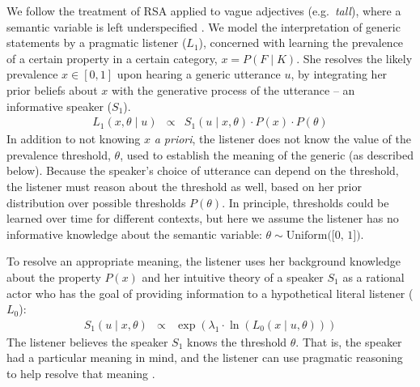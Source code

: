 \documentclass[12pt,letterpaper]{article}
\begin{document}
We follow the treatment of RSA applied to vague adjectives (e.g.~\emph{tall}), where a semantic variable is left underspecified \cite{Lassiter2013,Lassiter2015}.
We model the interpretation of generic statements by a pragmatic listener ($L_1$), concerned with learning the prevalence of a certain property in a certain category, $x=P(F \mid K)$.
She resolves the likely prevalence $x \in [0, 1]$ upon hearing a generic utterance $u$, by integrating her prior beliefs about $x$ with the generative process of the utterance -- an informative speaker ($S_1$).
%
\begin{eqnarray}
L_{1}(x , \theta \mid u) &\propto& S_{1}(u \mid x, \theta) \cdot P(x) \cdot P(\theta) \label{eq:L1}
\end{eqnarray}
%
In addition to not knowing $x$ \emph{a priori}, the listener does not know the value of the prevalence threshold, $\theta$, used to establish the meaning of the generic (as described below). Because the speaker's choice of utterance can depend on the threshold, the listener must reason about the threshold as well, based on her prior distribution over possible thresholds $P(\theta)$.
In principle, thresholds could be learned over time for different contexts, but here we assume the listener has no informative knowledge about the semantic variable: $\theta \sim \text{Uniform([0, 1])}$.

To resolve an appropriate meaning, the listener uses her background knowledge about the property $P(x)$ and her intuitive theory of a speaker $S_1$ as a rational actor who has the goal of providing information to a hypothetical literal listener ($L_0$):
\begin{eqnarray}
S_{1}(u \mid x, \theta) &\propto& \exp{(\lambda_1 \cdot \ln  ( {L_{0}(x \mid u, \theta)} ) ) }\label{eq:S1}
\end{eqnarray}
%
The listener believes the speaker $S_1$ knows the threshold $\theta$.
That is, the speaker had a particular meaning in mind, and the listener can use pragmatic reasoning to help resolve that meaning \cite{Lassiter2013, Lassiter2015, GoodmanLassiter}. 
\end{document}
